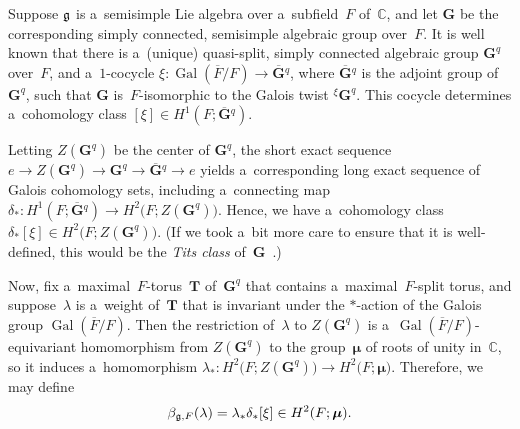 \documentclass[11pt]{article}
\DeclareMathOperator{\Gal}{Gal}
\numberwithin{equation}{section}
\newcommand{\Lie}[1]{\mathfrak{\lowercase{#1}}}
\begin{document}
\begin{defn} \label{BetaDefn}
Suppose $\Lie G$ is a~semisimple Lie algebra over a~subf\/ield~$F$ of~$\mathbb{C}$, and let $\mathbf{G}$ be the
corresponding simply connected, semisimple algebraic group over~$F$.
It is well known that there is a~(unique) quasi-split, simply connected algebraic group $\mathbf{G}^q$ over~$F$, and
a~$1$-cocycle $\xi \colon \Gal(\overline{F}/F) \to \overline{\mathbf{G}}{}^q$, where $\overline{\mathbf{G}}{}^q$ is the
adjoint group of~$\mathbf{G}^q$, such that $\mathbf{G}$ is~$F$-isomorphic to the Galois twist ${}^\xi \mathbf{G}^q$.
This cocycle determines a~cohomology class $[\xi] \in H^1(F; \overline{\mathbf{G}}{}^q)$.

Letting $Z(\mathbf{G}^q)$ be the center of $\mathbf{G}^q$, the short exact sequence $ e \to Z(\mathbf{G}^q) \to
\mathbf{G}^q \to \overline{\mathbf{G}}{}^q \to e $ yields a~corresponding long exact sequence of Galois cohomology sets,
including a~connecting map $\delta_* \colon H^1(F; \overline{\mathbf{G}}{}^q) \to H^2\bigl(F; Z(\mathbf{G}^q) \bigr)$.
Hence, we have a~cohomology class $\delta_* [\xi] \in H^2\bigl(F; Z(\mathbf{G}^q) \bigr)$.
(If we took a~bit more care to ensure that it is well-def\/ined, this would be the \emph{Tits class}
of~$\mathbf{G}$~\cite[p.~426]{KnusEtAl-BookOfInvols}.)

Now, f\/ix a~maximal~$F$-torus~$\mathbf{T}$ of~$\mathbf{G}^q$ that contains a~maximal~$F$-split torus, and
suppose~$\lambda$ is a~weight of~$\mathbf{T}$ that is invariant under the $*$-action of the Galois group $\Gal(\overline{F}/F)$.
Then the restriction of~$\lambda$ to $Z(\mathbf{G}^q)$ is a~$\Gal(\overline{F}/F)$-equivariant homomorphism from
$Z(\mathbf{G}^q)$ to the group~$\boldsymbol\mu$ of roots of unity in~$\mathbb{C}$, so it induces a~homomorphism
$\lambda_* \colon H^2\bigl(F; Z(\mathbf{G}^q) \bigr) \to H^2\bigl(F; \boldsymbol\mu \bigr)$.
Therefore, we may def\/ine
\begin{gather*}
\beta_{\Lie G,F}(\lambda) = \lambda_* \delta_* [\xi] \in H^2(F; \boldsymbol\mu).
\end{gather*}
\end{defn}
\end{document}
